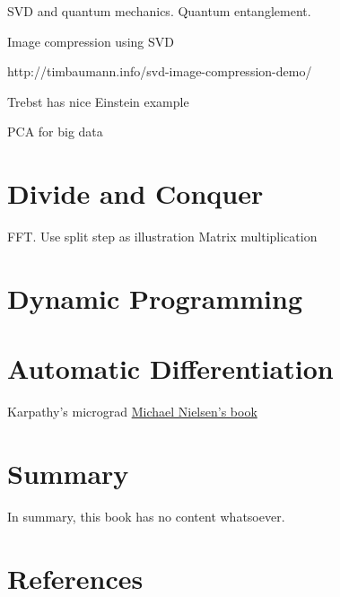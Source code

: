 \documentclass[
  letterpaper,
  DIV=11,
  numbers=noendperiod]{scrreprt}
\theoremstyle{definition}
\theoremstyle{remark}
\begin{document}
SVD and quantum mechanics. Quantum entanglement.

Image compression using SVD

http://timbaumann.info/svd-image-compression-demo/

Trebst has nice Einstein example

PCA for big data


\hypertarget{divide-and-conquer}{%
\chapter{Divide and Conquer}\label{divide-and-conquer}}

FFT. Use split step as illustration Matrix multiplication


\hypertarget{dynamic-programming}{%
\chapter{Dynamic Programming}\label{dynamic-programming}}


\hypertarget{automatic-differentiation}{%
\chapter{Automatic Differentiation}\label{automatic-differentiation}}

Karpathy's micrograd
\href{http://neuralnetworksanddeeplearning.com/}{Michael Nielsen's book}


\hypertarget{summary}{%
\chapter{Summary}\label{summary}}

In summary, this book has no content whatsoever.


\hypertarget{references}{%
\chapter*{References}\label{references}}

\end{document}

